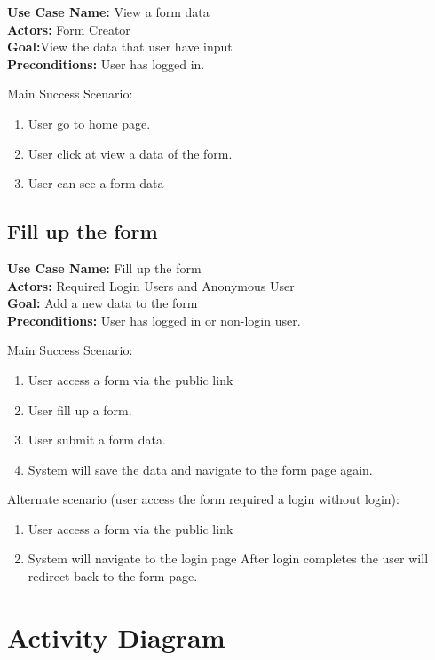 \documentclass[12pt,oneside,openright,a4paper]{cpe-english-project}
\begin{document}
\noindent\textbf{Use Case Name:} View a form data \\
\textbf{Actors:} Form Creator\\
\textbf{Goal:}View the data that user have input\\
\textbf{Preconditions:} User has logged in.

Main Success Scenario: 

\begin{enumerate}
    \item User go to home page.
    \item User click at view a data of the form.
    \item User can see a form data
\end{enumerate}

\subsection{Fill up the form}

\noindent\textbf{Use Case Name:} Fill up the form \\
\textbf{Actors:} Required Login Users and Anonymous User \\
\textbf{Goal:} Add a new data to the form \\
\textbf{Preconditions:} User has logged in or non-login user.

Main Success Scenario: 

\begin{enumerate}
    \item User access a form via the public link
    \item User fill up a form.
    \item User submit a form data.
    \item System will save the data and navigate to the form page again.
\end{enumerate}

Alternate scenario (user access the form required a login without login):

\begin{enumerate}
    \item User access a form via the public link
    \item System will navigate to the login page After login completes the user will redirect back to the form page.
\end{enumerate}

\newpage

\section{Activity Diagram}
\end{document}
